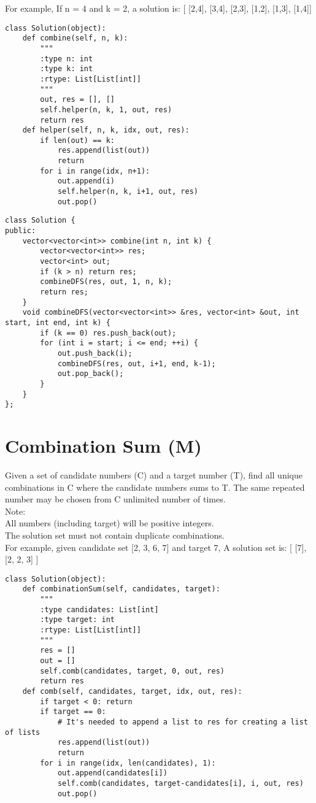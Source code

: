 For example, If n = 4 and k = 2, a solution is: [ [2,4], [3,4], [2,3], [1,2], [1,3], [1,4]]\\

\begin{lstlisting}
class Solution(object):
    def combine(self, n, k):
        """
        :type n: int
        :type k: int
        :rtype: List[List[int]]
        """
        out, res = [], []
        self.helper(n, k, 1, out, res)
        return res
    def helper(self, n, k, idx, out, res):
        if len(out) == k:
            res.append(list(out))
            return
        for i in range(idx, n+1):
            out.append(i)
            self.helper(n, k, i+1, out, res)
            out.pop()
\end{lstlisting}

\begin{lstlisting}
class Solution {
public:
    vector<vector<int>> combine(int n, int k) {
        vector<vector<int>> res;
        vector<int> out;
        if (k > n) return res;
        combineDFS(res, out, 1, n, k);
        return res;
    }
    void combineDFS(vector<vector<int>> &res, vector<int> &out, int start, int end, int k) {
        if (k == 0) res.push_back(out);
        for (int i = start; i <= end; ++i) {
            out.push_back(i);
            combineDFS(res, out, i+1, end, k-1);
            out.pop_back();
        }
    }
};
\end{lstlisting}


\section{Combination Sum (M)}
Given a set of candidate numbers (C) and a target number (T), find all unique combinations in C where the candidate numbers sums to T. The same repeated number may be chosen from C unlimited number of times.\\

Note:\\
    All numbers (including target) will be positive integers.\\
    The solution set must not contain duplicate combinations.\\

For example, given candidate set [2, 3, 6, 7] and target 7, A solution set is: [ [7], [2, 2, 3] ]\\

\begin{lstlisting}
class Solution(object):
    def combinationSum(self, candidates, target):
        """
        :type candidates: List[int]
        :type target: int
        :rtype: List[List[int]]
        """
        res = []
        out = []
        self.comb(candidates, target, 0, out, res)
        return res
    def comb(self, candidates, target, idx, out, res):
        if target < 0: return
        if target == 0:
            # It's needed to append a list to res for creating a list of lists
            res.append(list(out)) 
            return
        for i in range(idx, len(candidates), 1):
            out.append(candidates[i])
            self.comb(candidates, target-candidates[i], i, out, res)
            out.pop()
\end{lstlisting}

